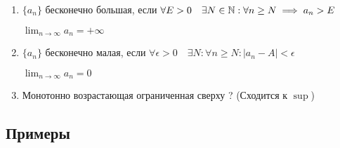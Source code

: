 \begin{enumerate}
\item 
    $\{a_n\}$ бесконечно большая, если $\forall E > 0 \quad \exists N \in \mathbb{N} : \forall n \geq N \implies a_n > E$

    $\lim_{n\to\infty} a_n = +\infty$

\item 
    $\{a_n\}$ бесконечно малая, если $\forall \epsilon > 0 \quad \exists N : \forall n \geq N : |a_n - A| < \epsilon$
    
    $\lim_{n\to\infty} a_n = 0$

\item
    Монотонно возрастающая ограниченная сверху ? (Сходится к $\sup$)
\end{enumerate}

\subsection{Примеры}

